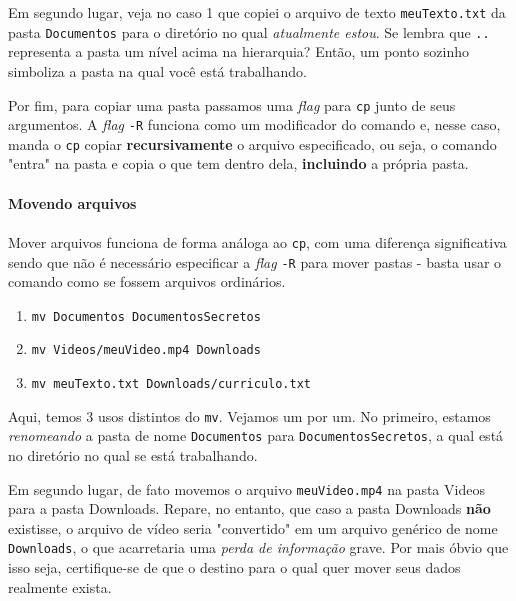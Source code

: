 \documentclass{article}
\begin{document}
	Em segundo lugar, veja no caso 1 que copiei o arquivo de texto \texttt{meuTexto.txt} da pasta \texttt{Documentos} 
	para o diretório no qual \textit{atualmente estou}. Se lembra que \texttt{..} representa a pasta um nível acima
	na hierarquia? Então, um ponto sozinho simboliza a pasta na qual você está trabalhando. 
	
	Por fim, para copiar uma pasta passamos uma \textit{flag} para \texttt{cp} junto de seus argumentos. 
	A \textit{flag} \texttt{-R} funciona como um modificador do comando e, nesse caso, manda o \texttt{cp}
	copiar \textbf{recursivamente} o arquivo especificado, ou seja, o comando "entra" na pasta e copia o que
	tem dentro dela, \textbf{incluindo} a própria pasta. 

	
	\paragraph{Movendo arquivos}
	\paragraph{}

	Mover arquivos funciona de forma análoga ao \texttt{cp}, com uma diferença significativa sendo que não é necessário 
	especificar a \textit{flag} \texttt{-R} para mover pastas - basta usar o comando como se fossem arquivos ordinários. 

	\begin{enumerate} 
		\item{\texttt{mv Documentos DocumentosSecretos}} 
		\item{\texttt{mv Videos/meuVideo.mp4 Downloads}} 
		\item{\texttt{mv meuTexto.txt Downloads/curriculo.txt}} 
	\end{enumerate} 

	Aqui, temos 3 usos distintos do \texttt{mv}. Vejamos um por um. No primeiro, estamos \textit{renomeando} a pasta de 
	nome \texttt{Documentos} para \texttt{DocumentosSecretos}, a qual está no diretório no qual se está trabalhando. 


	Em segundo lugar, de fato movemos o arquivo \texttt{meuVideo.mp4} na pasta Videos para a pasta Downloads. Repare, no 
	entanto, que caso a pasta Downloads \textbf{não} existisse, o arquivo de vídeo seria "convertido" em um arquivo 
	genérico de nome \texttt{Downloads}, o que acarretaria uma \textit{perda de informação} grave. Por mais óbvio que isso
	seja, certifique-se de que o destino para o qual quer mover seus dados realmente exista. 
\end{document}
